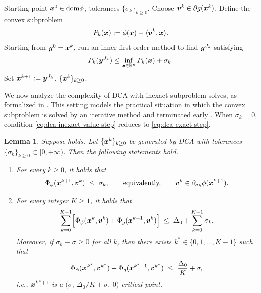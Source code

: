 \documentclass[english]{article}
\newtheorem{lemma}{Lemma}[section]
\begin{document}
\begin{algorithm}[tbp]
    \caption{\textbf{Inexact DCA}}
    \label{alg:inexact-dca-inner}
    \begin{algorithmic}[1]
         Starting point $\bm{x}^0\in\mathrm{dom}\phi$,
        tolerances $\{\sigma_k\}_{k\ge0}$.
            \STATE Choose $\bm{v}^k\in\partial g(\bm{x}^k)$.
            \STATE Define the convex subproblem
            \[
                P_k(\bm{x}):=\phi(\bm{x})-\langle\bm{v}^k,\bm{x}\rangle .
            \]
            \STATE Starting from $\bm{y}^0=\bm{x}^k$, run an inner first-order
            method to find $\bm{y}^{J_k}$ satisfying
            \begin{equation}
                P_k(\bm{y}^{J_k})
                \le
                \inf_{\bm{x}\in\mathbb{R}^n}P_k(\bm{x})+\sigma_k .
                \label{eq:dca-inexact-value-step}
            \end{equation}
            \STATE Set $\bm{x}^{k+1}:=\bm{y}^{J_k}$.
        \ENDFOR
         $\{\bm{x}^k\}_{k\ge0}$.
    \end{algorithmic}
\end{algorithm}

We now analyze the complexity of DCA with inexact subproblem solves, as
formalized in . This setting models the
practical situation in which the convex subproblem is solved by an
iterative method and terminated early \citep{yao2022large}. When
$\sigma_k=0$, condition \eqref{eq:dca-inexact-value-step} reduces to
\eqref{eq:dca-exact-step}.

\begin{lemma}
\label{lem:dca-inexact-complexity}
Suppose  holds. Let
$\{\bm{x}^k\}_{k\ge0}$ be generated by DCA with tolerances
$\{\sigma_k\}_{k\ge0}\subset[0,+\infty)$. Then the following statements
hold.
\begin{enumerate}
    \item[(i)] For every $k\ge0$, it holds that
    \[
        \Phi_\phi(\bm{x}^{k+1},\bm{v}^k)\;\le\;\sigma_k,
        \qquad\text{equivalently,}\qquad
        \bm{v}^k\in\partial_{\sigma_k}\phi(\bm{x}^{k+1}).
    \]
    \item[(ii)] For every integer $K\ge1$, it holds that
    \begin{equation}
        \sum_{k=0}^{K-1}
        \Bigl[
            \Phi_\phi(\bm{x}^k,\bm{v}^k)
            +\Phi_g(\bm{x}^{k+1},\bm{v}^k)
        \Bigr]
        \;\le\;
        \Delta_0+\sum_{k=0}^{K-1}\sigma_k .
        \label{eq:dca-inexact-telescope}
    \end{equation} Moreover, if  $\sigma_k\equiv\sigma\ge0$ for all $k$, then there exists $k^*\in\{0,1,\ldots,K-1\}$ such that
    \begin{equation}
        \Phi_\phi(\bm{x}^{k^*},\bm{v}^{k^*})
        +\Phi_g(\bm{x}^{k^*+1},\bm{v}^{k^*})
        \;\le\;
        \frac{\Delta_0}{K}+\sigma,
        \label{eq:dca-inexact-best-index}
    \end{equation} i.e.,  $\bm{x}^{k^*+1}$ is a
        $\bigl(\sigma,\ \Delta_0/K+\sigma,\ 0\bigr)$-critical point.
\end{enumerate}
\end{lemma}
\end{document}

